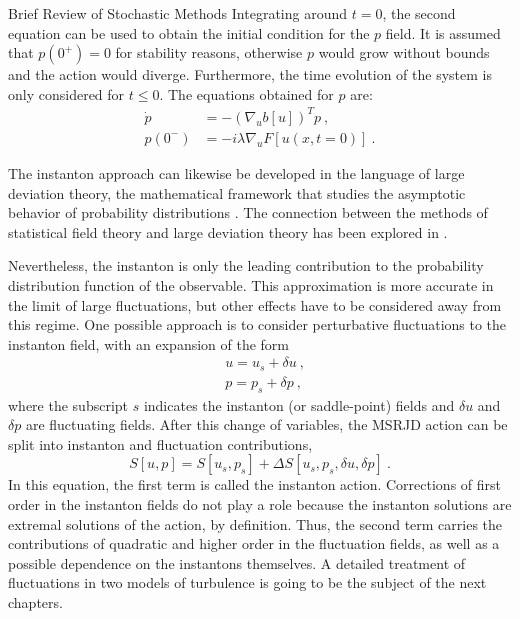 \begin{chapter}{Brief Review of Stochastic Methods}
Integrating around $t=0$, the second equation can be used to obtain the initial condition
for the $p$ field. It is assumed that $p(0^+)=0$ for stability reasons,
otherwise $p$ would grow without bounds and the action would diverge.
Furthermore, the time evolution of the system is only considered for $t \leq 0 $.
The equations obtained for $p$ are:
\begin{equation}
\begin{split}
    \dot{p} &= - (\nabla_u b[u])^T p \ , \\
    p(0^-) &= -i \lambda \nabla_u F[u(x,t=0)] \ .
\end{split}
\end{equation}

The instanton approach can likewise be developed in the language of large deviation theory,
the mathematical framework that studies the asymptotic behavior of
probability distributions \parencite{varadhan1966}.
The connection between the methods of statistical field theory and
large deviation theory has been explored in \textcite{ellis2007,touchette2009}.

Nevertheless, the instanton is only the leading contribution to the
probability distribution function of the observable. This approximation
is more accurate in the limit of large fluctuations, but other effects
have to be considered away from this regime. One possible approach is to
consider perturbative fluctuations to the instanton field, with an expansion of
the form
\begin{equation} \label{eq:perturb-instanton}
\begin{split}
    &u = u_s + \delta u \ , \\
    &p = p_s + \delta p \ ,
\end{split}
\end{equation}
where the subscript $s$ indicates the instanton (or saddle-point) fields and
$\delta u$ and $\delta p$ are fluctuating fields.
After this change of variables, the MSRJD action can be split into
instanton and fluctuation contributions,
\begin{equation} \label{eq:perturb-action}
    S[u,p] = S[u_s,p_s] +
    \Delta S[ u_s, p_s, \delta u, \delta p] \ .
\end{equation}
In this equation, the first term is called the instanton action.
Corrections of first order in the instanton fields do
not play a role because the instanton solutions are extremal solutions of
the action, by definition.
Thus, the second term carries the contributions of quadratic and higher order
in the fluctuation fields, as well as a possible dependence on the
instantons themselves.
A detailed treatment of fluctuations in two models of turbulence
is going to be the subject of the next chapters.


\end{chapter}
